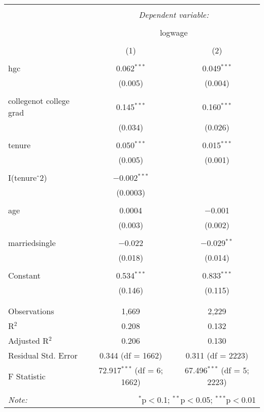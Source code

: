 \documentclass{article}
\begin{document}
\begin{table}[!htbp] \centering 
  \caption{} 
  \label{} 
\begin{tabular}{@{\extracolsep{5pt}}lcc} 
\\[-1.8ex]\hline 
\hline \\[-1.8ex] 
 & \multicolumn{2}{c}{\textit{Dependent variable:}} \\ 
\cline{2-3} 
\\[-1.8ex] & \multicolumn{2}{c}{logwage} \\ 
\\[-1.8ex] & (1) & (2)\\ 
\hline \\[-1.8ex] 
 hgc & 0.062$^{***}$ & 0.049$^{***}$ \\ 
  & (0.005) & (0.004) \\ 
  & & \\ 
 collegenot college grad & 0.145$^{***}$ & 0.160$^{***}$ \\ 
  & (0.034) & (0.026) \\ 
  & & \\ 
 tenure & 0.050$^{***}$ & 0.015$^{***}$ \\ 
  & (0.005) & (0.001) \\ 
  & & \\ 
 I(tenure$\hat{\mkern6mu}$2) & $-$0.002$^{***}$ &  \\ 
  & (0.0003) &  \\ 
  & & \\ 
 age & 0.0004 & $-$0.001 \\ 
  & (0.003) & (0.002) \\ 
  & & \\ 
 marriedsingle & $-$0.022 & $-$0.029$^{**}$ \\ 
  & (0.018) & (0.014) \\ 
  & & \\ 
 Constant & 0.534$^{***}$ & 0.833$^{***}$ \\ 
  & (0.146) & (0.115) \\ 
  & & \\ 
\hline \\[-1.8ex] 
Observations & 1,669 & 2,229 \\ 
R$^{2}$ & 0.208 & 0.132 \\ 
Adjusted R$^{2}$ & 0.206 & 0.130 \\ 
Residual Std. Error & 0.344 (df = 1662) & 0.311 (df = 2223) \\ 
F Statistic & 72.917$^{***}$ (df = 6; 1662) & 67.496$^{***}$ (df = 5; 2223) \\ 
\hline 
\hline \\[-1.8ex] 
\textit{Note:}  & \multicolumn{2}{r}{$^{*}$p$<$0.1; $^{**}$p$<$0.05; $^{***}$p$<$0.01} \\ 
\end{tabular} 
\end{table} 
\end{document}

